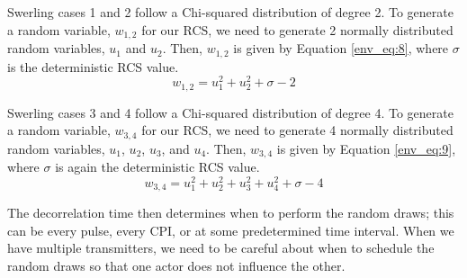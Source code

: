Swerling cases 1 and 2 follow a Chi-squared distribution of degree 2. To generate a random variable, $w_{1,2}$ for our RCS, we need to generate 2 normally distributed random variables, $u_1$ and $u_2$. Then, $w_{1,2}$ is given by Equation \ref{env_eq:8}, where $\sigma$ is the deterministic RCS value.
\begin{equation}
  \label{env_eq:8}
w_{1,2} = u_1^2 + u_2^2 + \sigma - 2
  \end{equation}

Swerling cases 3 and 4 follow a Chi-squared distribution of degree 4. To generate a random variable, $w_{3,4}$ for our RCS, we need to generate 4 normally distributed random variables, $u_1$, $u_2$, $u_3$, and $u_4$. Then, $w_{3,4}$ is given by Equation \ref{env_eq:9}, where $\sigma$ is again the deterministic RCS value.
\begin{equation}
  \label{env_eq:9}
w_{3,4} = u_1^2 + u_2^2 + u_3^2 + u_4^2 + \sigma - 4
  \end{equation}
  
The decorrelation time then determines when to perform the random draws; this can be every pulse, every CPI, or at some predetermined time interval. When we have multiple transmitters, we need to be careful about when to schedule the random draws so that one actor does not influence the other.  